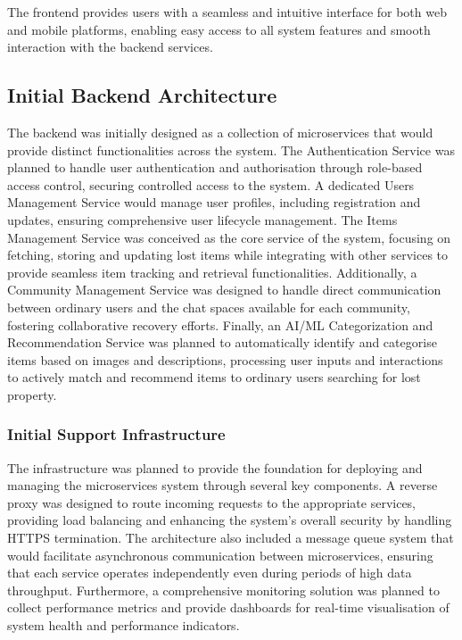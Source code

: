 The frontend provides users with a seamless and intuitive interface for both web and mobile platforms, enabling easy access to all system features and smooth interaction with the backend services.

\subsection{Initial Backend Architecture}

The backend was initially designed as a collection of microservices that would provide distinct functionalities across the system. The Authentication Service was planned to handle user authentication and authorisation through role-based access control, securing controlled access to the system. A dedicated Users Management Service would manage user profiles, including registration and updates, ensuring comprehensive user lifecycle management. The Items Management Service was conceived as the core service of the system, focusing on fetching, storing and updating lost items while integrating with other services to provide seamless item tracking and retrieval functionalities. Additionally, a Community Management Service was designed to handle direct communication between ordinary users and the chat spaces available for each community, fostering collaborative recovery efforts. Finally, an AI/ML Categorization and Recommendation Service was planned to automatically identify and categorise items based on images and descriptions, processing user inputs and interactions to actively match and recommend items to ordinary users searching for lost property.

\subsubsection{Initial Support Infrastructure}

The infrastructure was planned to provide the foundation for deploying and managing the microservices system through several key components. A reverse proxy was designed to route incoming requests to the appropriate services, providing load balancing and enhancing the system's overall security by handling HTTPS termination. The architecture also included a message queue system that would facilitate asynchronous communication between microservices, ensuring that each service operates independently even during periods of high data throughput. Furthermore, a comprehensive monitoring solution was planned to collect performance metrics and provide dashboards for real-time visualisation of system health and performance indicators.

